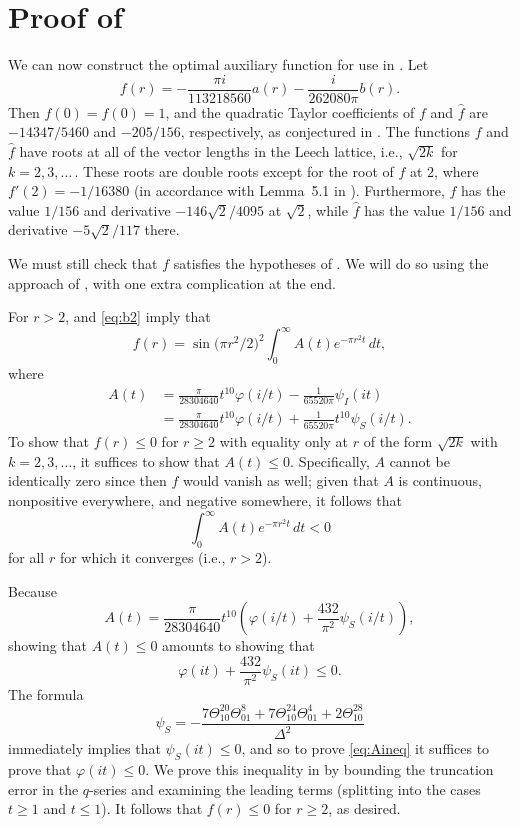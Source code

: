 \documentclass{aomart}
\theoremstyle{plain}
\numberwithin{theorem}{section}
\numberwithin{equation}{section}
\begin{document}
\section{Proof of }
\label{sec:proof}

\vspace{-0.15cm}

We can now construct the optimal auxiliary function for use in
. Let
\[
f(r) = -\frac{\pi i}{113218560} a(r) - \frac{i}{262080\pi}b(r).
\]
Then $f(0) = \widehat{f}(0) = 1$, and the quadratic Taylor coefficients of
$f$ and $\widehat{f}$ are $-14347/5460$ and $-205/156$, respectively, as
conjectured in \cite{CM}. The functions $f$ and $\widehat{f}$ have roots at
all of the vector lengths in the Leech lattice, i.e., $\sqrt{2k}$ for
$k=2,3,\dots$\,. These roots are double roots except for the root of $f$ at
$2$, where $f'(2) = -1/16380$ (in accordance with Lemma~5.1 in \cite{CM}).
Furthermore, $f$ has the value $1/156$ and derivative $-146\sqrt{2}/4095$ at
$\sqrt{2}$, while $\widehat{f}$ has the value $1/156$ and derivative
$-5\sqrt{2}/117$ there.

We must still check that $f$ satisfies the hypotheses of
.  We will do so using the approach of \cite{V},
with one extra complication at the end.

For $r>2$,  and \eqref{eq:b2} imply that
\[
f(r) = \sin\mathopen{}\big(\pi r^2/2\big)^2\mathclose{} \int_0^\infty A(t) e^{-\pi r^2 t} \, dt,
\]
where
\begin{align*}
A(t) &= \frac{\pi}{28304640} t^{10} \varphi(i/t) - \frac{1}{65520\pi} \psi_I(it)\\
&= \frac{\pi}{28304640} t^{10} \varphi(i/t) + \frac{1}{65520\pi} t^{10}\psi_S(i/t).
\end{align*}
To show that $f(r) \le 0$ for $r\ge 2$ with equality only at $r$ of the form
$\sqrt{2k}$ with $k = 2, 3, \dots$, it suffices to show that $A(t) \le 0$.
Specifically, $A$ cannot be identically zero since then $f$ would vanish as
well; given that $A$ is continuous, nonpositive everywhere, and negative
somewhere, it follows that
\[
\int_0^\infty A(t) e^{-\pi r^2 t} \, dt < 0
\]
for all $r$ for which it converges (i.e., $r>2$).

Because
\[
A(t) = \frac{\pi}{28304640} t^{10} \left(\varphi(i/t) + \frac{432}{\pi^2} \psi_S(i/t)\right),
\]
showing that $A(t) \le 0$ amounts to showing that
\begin{equation} \label{eq:Aineq}
\varphi(it) + \frac{432}{\pi^2} \psi_S(it) \le 0.
\end{equation}
The formula
\[
\psi_S = -\frac{7 \Theta_{10}^{20} \Theta_{01}^8 + 7
\Theta_{10}^{24} \Theta_{01}^4 + 2 \Theta_{10}^{28}}{\Delta^2}
\]
immediately implies that $\psi_S(it) \le 0$, and so to prove \eqref{eq:Aineq}
it suffices to prove that $\varphi(it) \le 0$.  We prove this inequality in
 by bounding the truncation error in the
$q$-series and examining the leading terms (splitting into the cases $t \ge
1$ and $t \le 1$). It follows that $f(r) \le 0$ for $r \ge 2$, as desired.
\end{document}
